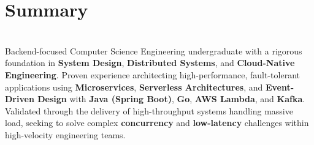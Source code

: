 \MainDivider
\section*{Summary}
\BigDivider\\
\noindent
Backend-focused Computer Science Engineering undergraduate with a rigorous foundation in \textbf{System Design}, \textbf{Distributed Systems}, and \textbf{Cloud-Native Engineering}. Proven experience architecting high-performance, fault-tolerant applications using \textbf{Microservices}, \textbf{Serverless Architectures}, and \textbf{Event-Driven Design} with \textbf{Java (Spring Boot)}, \textbf{Go}, \textbf{AWS Lambda}, and \textbf{Kafka}. Validated through the delivery of high-throughput systems handling massive load, seeking to solve complex \textbf{concurrency} and \textbf{low-latency} challenges within high-velocity engineering teams.
